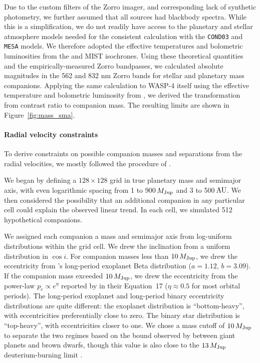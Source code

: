 \documentclass[12pt,twocolumn,tighten]{aastex62}
\begin{document}
Due to the custom filters of the Zorro imager, and corresponding lack
of synthetic photometry, we further assumed that all sources had
blackbody spectra. While this is a simplification, we do not
readily have access to the planetary and stellar atmosphere models
needed for the consistent calculation with the \texttt{COND03} and
\texttt{MESA} models.  We therefore adopted the effective temperatures
and bolometric luminosities from the \citet{baraffe_evolutionary_2003}
and MIST isochrones.  Using these theoretical quantities and the
empirically-measured Zorro bandpasses, we calculated absolute
magnitudes in the 562 and 832 nm Zorro bands for stellar and planetary
mass companions.  Applying the same calculation to WASP-4 itself using
the effective temperature and bolometric luminosity from
, we derived the transformation from
contrast ratio to companion mass.  The resulting limits are shown in
Figure~\ref{fig:mass_sma}.


\paragraph{Radial velocity constraints}

To derive constraints on possible companion masses and separations
from the radial velocities, we mostly followed the procedure of
\citet{bryan_excess_2019}. 

We began by defining a $128\times128$ grid in true planetary mass and
semimajor axis, with even logarithmic spacing from 1 to 900$\,$$M_{\rm
Jup}$ and 3 to 500$\,$${\rm AU}$.  We then considered the possibility
that an additional companion in any particular cell could explain the
observed linear trend.  In each cell, we simulated 512 hypothetical
companions.

We assigned each companion a mass and semimajor axis from log-uniform
distributions within the grid cell. We drew the inclination from a
uniform distribution in $\cos i$.  For companion masses less than
$10\,M_{\rm Jup}$, we drew the eccentricity from
\citet{kipping_beta_2013}'s long-period exoplanet Beta distribution
($a=1.12$, $b=3.09$).  If the companion mass exceeded $10\,M_{\rm
Jup}$, we drew the eccentricity from the power-law $p_e \propto
e^\eta$ reported by \citet{moe_mind_2017} in their Equation~17 ($\eta
\approx 0.5$ for most orbital periods).  The long-period exoplanet and
long-period binary eccentricity distributions are quite different: the
exoplanet distribution is ``bottom-heavy'', with eccentricities
preferentially close to zero.  The binary star distribution is
``top-heavy'', with eccentricities closer to one.  We chose a mass
cutoff of $10\,M_{\rm Jup}$ to separate the two regimes based on the
bound observed by \citet{schlaufman_evidence_2018} between giant
planets and brown dwarfs, though this value is also close to the
$13\,M_{\rm Jup}$ deuterium-burning limit \citep[{\it
e.g.},][]{burrows_nongray_1997}.
\end{document}
